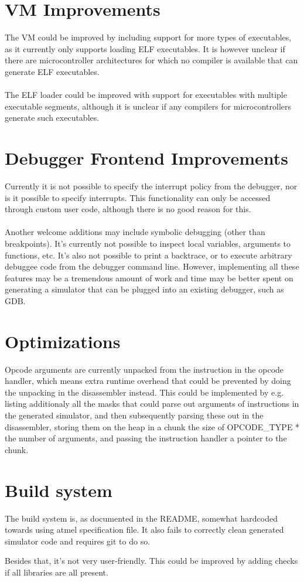 \section{VM Improvements}
The VM could be improved by including support for more types of executables, as
it currently only supports loading ELF executables. It is however unclear if there are
microcontroller architectures for which no compiler is available that can
generate ELF executables.\\
\\
The ELF loader could be improved with support for executables with multiple 
executable segments, although it is unclear if any compilers for microcontrollers
generate such executables.

\section{Debugger Frontend Improvements}
Currently it is not possible to specify the interrupt policy from the
debugger, nor is it possible to specify interrupts. This functionality can
only be accessed through custom user code, although there is no good reason
for this.\\
\\
Another welcome additions may include symbolic debugging (other than
breakpoints). It's currently not possible to inspect local variables,
arguments to functions, etc. It's also not possible to print a backtrace, or
to execute arbitrary debuggee code from the debugger command line. 
However, implementing all these
features may be a tremendous amount of work and time may be better spent on
generating a simulator that can be plugged into an existing debugger, such as
GDB.

\section{Optimizations}
Opcode arguments are currently unpacked from the instruction in the opcode
handler, which means extra runtime overhead that could be prevented by doing
the unpacking in the disassembler instead. This could be implemented by e.g.
listing additionaly all the masks that could parse out arguments of
instructions in the generated simulator, and then subsequently parsing these
out in the disassembler, storing them on the heap in a chunk the size of 
OPCODE\_TYPE * the number of arguments, and passing the instruction handler a 
pointer to the chunk.

\section{Build system}
The build system is, as documented in the README, somewhat hardcoded towards
using atmel specification file. It also fails to correctly clean generated
simulator code and requires git to do so.

Besides that, it's not very user-friendly. This could be improved by adding
checks if all libraries are all present.
